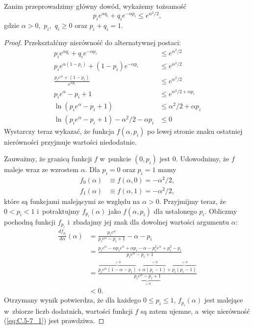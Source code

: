 \exercise{} %

\noindent Zanim przeprowadzimy główny dowód, wykażemy tożsamość
\[
	p_ie^{\alpha q_i}+q_ie^{-\alpha p_i} \le e^{\alpha^2\!/2}, \tag{$*$}\label{eq:C.5-7_1}
\]
gdzie $\alpha>0$,~$p_i$,~$q_i\ge0$ oraz $p_i+q_i=1$.

\begin{proof}
	Przekształćmy nierówność do alternatywnej postaci:
	\begin{align*}
		p_ie^{\alpha q_i}+q_ie^{-\alpha p_i} &\le e^{\alpha^2\!/2} \\[1mm]
		p_ie^{\alpha(1-p_i)}+(1-p_i)e^{-\alpha p_i} &\le e^{\alpha^2\!/2} \\[2mm]
		\frac{p_ie^\alpha+(1-p_i)}{e^{\alpha p_i}} &\le e^{\alpha^2\!/2} \\[1mm]
		p_ie^\alpha-p_i+1 &\le e^{\alpha^2\!/2+\alpha p_i} \\[1mm]
		\ln(p_ie^\alpha-p_i+1) &\le \alpha^2\!/2+\alpha p_i \\[1mm]
		\ln(p_ie^\alpha-p_i+1)-\alpha^2\!/2-\alpha p_i &\le 0
	\end{align*}
	Wystarczy teraz wykazać, że funkcja $f(\alpha,p_i)$ po lewej stronie znaku ostatniej nierówności przyjmuje wartości niedodatnie.

	Zauważmy, że granicą funkcji $f$ w~punkcie $(0,p_i)$ jest 0. Udowodnimy, że $f$ maleje wraz ze wzrostem $\alpha$. Dla $p_i=0$ oraz $p_i=1$ mamy
	\begin{align*}
	    f_0(\alpha) &\equiv f(\alpha,0) = -\alpha^2\!/2, \\
		f_1(\alpha) &\equiv f(\alpha,1) = -\alpha^2\!/2,
	\end{align*}
	które są funkcjami malejącymi ze względu na $\alpha>0$. Przyjmijmy teraz, że $0<p_i<1$ i~potraktujmy $f_{p_i}(\alpha)$ jako $f(\alpha,p_i)$ dla ustalonego $p_i$. Obliczmy pochodną funkcji $f_{p_i}$ i~zbadajmy jej znak dla dowolnej wartości argumentu $\alpha$:
	\begin{align*}
	    \frac{df_{p_i}}{d\alpha}(\alpha) &= \frac{p_ie^\alpha}{p_ie^\alpha-p_i+1}-\alpha-p_i \\[1mm]
		&= \frac{p_ie^\alpha-\alpha p_ie^\alpha+\alpha p_i-\alpha-p_i^2e^\alpha+p_i^2-p_i}{p_ie^\alpha-p_i+1} \\[1mm]
		&= \frac{\overbrace{p_ie^\alpha(1-\alpha-p_i)}^{<0}+\overbrace{\alpha(p_i-1)}^{<0}+\overbrace{p_i(p_i-1)}^{<0}}{\underbrace{p_ie^\alpha-p_i+1}_{>0}} \\
		&< 0.
	\end{align*}
	Otrzymany wynik potwierdza, że dla każdego $0\le p_i\le1$, $f_{p_i}(\alpha)$ jest malejące w~zbiorze liczb dodatnich, wartości funkcji $f$ są zatem ujemne, a~więc nierówność (\ref{eq:C.5-7_1}) jest prawdziwa.
\end{proof}

